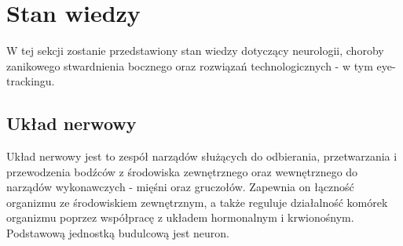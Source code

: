 \documentclass[twoside,a4paper]{book}
\begin{document}
\chapter{Stan wiedzy}
W tej sekcji zostanie przedstawiony stan wiedzy dotyczący neurologii, choroby zanikowego stwardnienia bocznego  oraz rozwiązań technologicznych - w tym eye-trackingu.
\section{Układ nerwowy}
Układ nerwowy jest to zespół narządów służących do odbierania, przetwarzania i przewodzenia bodźców z środowiska zewnętrznego oraz wewnętrznego do narządów wykonawczych - mięśni oraz gruczołów. Zapewnia on łączność organizmu ze środowiskiem zewnętrznym, a także reguluje działalność komórek organizmu poprzez współpracę z układem hormonalnym i krwionośnym. Podstawową jednostką budulcową jest neuron.
\end{document}
